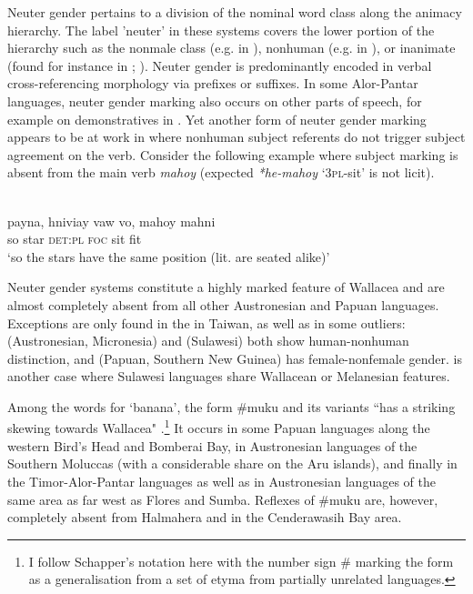 Neuter gender pertains to a division of the nominal word class along the animacy hierarchy. The label 'neuter' in these systems covers the lower portion of the hierarchy such as the nonmale class (e.g. in ), nonhuman (e.g. in ), or inanimate (found for instance in ; \citealt[128]{schapper2015wallacea}). Neuter gender is predominantly encoded in verbal cross-referencing morphology via prefixes or suffixes. In some Alor-Pantar languages, neuter gender marking also occurs on other parts of speech, for example on demonstratives in . Yet another form of neuter gender marking appears to be at work in  where nonhuman subject referents do not trigger subject agreement on the verb. Consider the following example where subject marking is absent from the main verb \textit{mahoy} (expected \textit{*he-mahoy} `\textsc{3pl}-sit' is not licit).

\ea 
\\
\gll payna, hniviay vaw vo, mahoy mahni \\
so star \textsc{det}:\textsc{pl} \textsc{foc} sit fit \\
\glft `so the stars have the same position
(lit. are seated alike)'\\ 
\z
\xe

Neuter gender systems constitute a highly marked feature of Wallacea and are almost completely absent from all other Austronesian and Papuan languages. Exceptions are only found in the  in Taiwan, as well as in some outliers:  (Austronesian, Micronesia) and  (Sulawesi) both show human-nonhuman distinction, and  (Papuan, Southern New Guinea) has female-nonfemale gender.  is another case where Sulawesi languages share Wallacean or Melanesian features.

Among the words for `banana', the form \#muku and its variants ``has a striking skewing towards Wallacea" \citep[132]{schapper2015wallacea}.\footnote{I follow Schapper's notation here with the number sign \# marking the form as a generalisation from a set of etyma from partially unrelated languages.} It occurs in some Papuan languages along the western Bird's Head and Bomberai Bay, in Austronesian languages of the Southern Moluccas (with a considerable share on the Aru islands), and finally in the Timor-Alor-Pantar languages as well as in Austronesian languages of the same area as far west as Flores and Sumba. Reflexes of \#muku are, however, completely absent from Halmahera and in the Cenderawasih Bay area.

